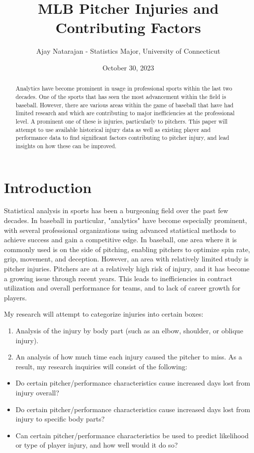 \documentclass{article}
\title{MLB Pitcher Injuries and Contributing Factors}
\author{Ajay Natarajan - Statistics Major, University of Connecticut}
\date{October 30, 2023}
\begin{document}
\maketitle

\begin{abstract}
Analytics have become prominent in usage in professional sports within the last two decades. One of the sports that has seen the most advancement within the field is baseball. However, there are various areas within the game of baseball that have had limited research and which are contributing to major inefficiencies at the professional level. A prominent one of these is injuries, particularly to pitchers. This paper will attempt to use available historical injury data as well as existing player and performance data to find significant factors contributing to pitcher injury, and lead insights on how these can be improved.
\end{abstract}

\section{Introduction}
Statistical analysis in sports has been a burgeoning field over the past few decades. In baseball in particular, "analytics" have become especially prominent, with several professional organizations using advanced statistical methods to achieve success and gain a competitive edge. In baseball, one area where it is commonly used is on the side of pitching, enabling pitchers to optimize spin rate, grip, movement, and deception. However, an area with relatively limited study is pitcher injuries. Pitchers are at a relatively high risk of injury, and it has become a growing issue through recent years. This leads to inefficiencies in contract utilization and overall performance for teams, and to lack of career growth for players. 

My research will attempt to categorize injuries into certain boxes:
\begin{enumerate}
\item Analysis of the injury by body part (such as an elbow, shoulder, or oblique injury). 
\item An analysis of how much time each injury caused the pitcher to miss. As a result, my research inquiries will consist of the following:
\end{enumerate}
\begin{itemize}
  \item Do certain pitcher/performance characteristics cause increased days lost from injury overall?
  \item Do certain pitcher/performance characteristics cause increased days lost from injury to specific body parts?
  \item Can certain pitcher/performance characteristics be used to predict likelihood or type of player injury, and how well would it do so?
\end{itemize}
\end{document}
